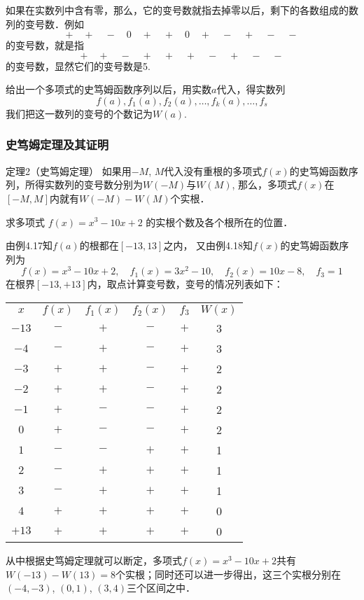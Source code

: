 如果在实数列中含有零，那么，它的变号数就指去掉零以后，剩下的各数组成的数列的变号数．例如
\begin{equation}
    +\quad +\quad -\quad 0\quad +\quad +\quad 0\quad +\quad -\quad +\quad -\quad -
\end{equation}
的变号数，就是指
\begin{equation}
    +\quad +\quad -\quad +\quad +\quad +\quad -\quad +\quad -\quad -
\end{equation}
的变号数，显然它们的变号数是5.

给出一个多项式的史笃姆函数序列以后，用实数$a$代入，得实数列
\[f (a) ,f_1 (a) ,f_2 (a) , \ldots,f_k (a) , \ldots,f_s\] 
我们把这一数列的变号的个数记为$W(a)$.

\subsubsection{史笃姆定理及其证明}

\begin{blk}{定理2（史笃姆定理）}
    如果用$-M$, $M$代入没有重根的多项式$f(x)$的史笃姆函数序列，所得实数列的变号数分别为$W(-M)$与$W(M)$, 那么，多项式$f(x)$在$[-M,M]$内就有$W(-M)-W(M)$个实根．
\end{blk}

\begin{example}
求多项式
$f (x) =x^3-10x+2$
的实根个数及各个根所在的位置．
\end{example}

\begin{solution}
    由例4.17知$f(a)$的根都在$[-13, 13]$之内，
    又由例4.18知$f(x)$的史笃姆函数序列为
\[f (x) =x^3-10x+2,\quad f_1(x) =3x^2-10,\quad f_2 (x) =10x-8,\quad f_3=1\]
在根界$[-13,+13]$内，取点计算变号数，变号的情况列表如下：
\begin{center}
    \begin{tabular}{cccccc}
$x$ & $f(x)$ & $f_1(x)$ & $f_2(x)$ & $f_3$ & $W(x)$\\
$-13$ & $-$ &$+$ & $-$ &$+$&3\\
$-4$ & $-$ &$+$ & $-$ &$+$&3\\
$-3$ & $+$ &$+$ & $-$ &$+$&2\\
$-2$ & $+$ &$+$ & $-$ &$+$&2\\
$-1$ & $+$ &$-$ & $-$ &$+$&2\\
$0$ & $+$ &$-$ & $-$ &$+$&2\\
$1$ & $-$ &$-$ & $+$ &$+$&1\\
$2$ & $-$ &$+$ & $+$ &$+$&1\\
$3$ & $-$ &$+$ & $+$ &$+$&1\\
$4$ & $+$ &$+$ & $+$ &$+$&0\\
$+13$ & $+$ &$+$ & $+$ &$+$&0\\
    \end{tabular}
\end{center}
从中根据史笃姆定理就可以断定，多项式$f(x)=x^3-10x+2$共有$W(-13)-W(13)=8$个实根；同时还可以进一步得出，这三个实根分别在$(-4,-3)$, $(0, 1)$, $(3, 4)$三个区间之中．
\end{solution}

